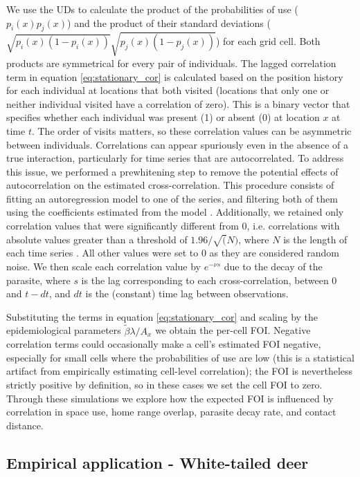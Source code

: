 \documentclass[letterpaper]{article}
\begin{document}
We use the UDs to calculate the product of the probabilities of use ($p_i(x)p_j(x)$) and the product of their standard deviations ($\sqrt{p_i(x)(1-p_i(x))}\sqrt{p_j(x)(1-p_j(x))}$) for each grid cell. Both products are symmetrical for every pair of individuals. 
The lagged correlation term in equation \ref{eq:stationary_cor} is calculated based on the position history for each individual at locations that both visited (locations that only one or neither individual visited have a correlation of zero). This is a binary vector that specifies whether each individual was present (1) or absent (0) at location $x$ at time $t$. 
The order of visits matters, so these correlation values can be asymmetric between individuals. 
Correlations can appear spuriously even in the absence of a true interaction, particularly for time series that are autocorrelated. To address this issue, we performed a prewhitening step to remove the potential effects of autocorrelation on the estimated cross-correlation. This procedure consists of fitting an autoregression model to one of the series, and filtering both of them using the coefficients estimated from the model \citep{Dean2016}. Additionally, we retained only correlation values that were significantly different from 0, i.e. correlations with absolute values greater than a threshold of $1.96/\sqrt(N)$, where $N$ is the length of each time series \citep{Dean2016}. All other values were set to 0 as they are considered random noise.
We then scale each correlation value by $e^{-\nu s}$ due to the decay of the parasite, where $s$ is the lag corresponding to each cross-correlation, between 0 and $t-dt$, and $dt$ is the (constant) time lag between observations. 

Substituting the terms in equation \ref{eq:stationary_cor} and scaling by the epidemiological parameters $\tilde\beta\lambda/ A_x$ we obtain the per-cell FOI. Negative correlation terms could occasionally make a cell's estimated FOI negative, especially for small cells where the probabilities of use are low (this is a statistical artifact from empirically estimating cell-level correlation); the FOI is nevertheless strictly positive by definition, so in these cases we set the cell FOI to zero.
Through these simulations we explore how the expected FOI is influenced by correlation in space use, home range overlap, parasite decay rate, and contact distance. %

\subsection*{Empirical application - White-tailed deer}
\end{document}
